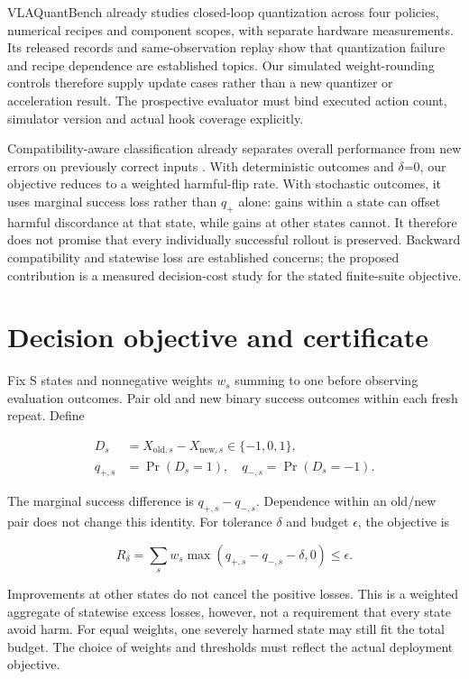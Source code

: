 \documentclass[conference]{IEEEtran}
\begin{document}
VLAQuantBench \cite{quantbench} already studies closed-loop quantization across four policies, numerical recipes and component scopes, with separate hardware measurements. Its released records and same-observation replay show that quantization failure and recipe dependence are established topics. Our simulated weight-rounding controls therefore supply update cases rather than a new quantizer or acceleration result. The prospective evaluator must bind executed action count, simulator version and actual hook coverage explicitly.

Compatibility-aware classification already separates overall performance from new errors on previously correct inputs \cite{backward}. With deterministic outcomes and $\delta$=0, our objective reduces to a weighted harmful-flip rate. With stochastic outcomes, it uses marginal success loss rather than $q_+$ alone: gains within a state can offset harmful discordance at that state, while gains at other states cannot. It therefore does not promise that every individually successful rollout is preserved. Backward compatibility and statewise loss are established concerns; the proposed contribution is a measured decision-cost study for the stated finite-suite objective.

\section{Decision objective and certificate}

Fix S states and nonnegative weights $w_s$ summing to one before observing evaluation outcomes. Pair old and new binary success outcomes within each fresh repeat. Define

\begin{align}
D_s&=X_{\mathrm{old},s}-X_{\mathrm{new},s}\in\{-1,0,1\},\\
q_{+,s}&=\Pr(D_s=1),\quad q_{-,s}=\Pr(D_s=-1).
\end{align}

The marginal success difference is $q_{+,s}-q_{-,s}$. Dependence within an old/new pair does not change this identity. For tolerance $\delta$ and budget $\epsilon$, the objective is

\begin{equation}
R_\delta=\sum_s w_s\max(q_{+,s}-q_{-,s}-\delta,0)\leq\epsilon.
\end{equation}

Improvements at other states do not cancel the positive losses. This is a weighted aggregate of statewise excess losses, however, not a requirement that every state avoid harm. For equal weights, one severely harmed state may still fit the total budget. The choice of weights and thresholds must reflect the actual deployment objective.
\end{document}

